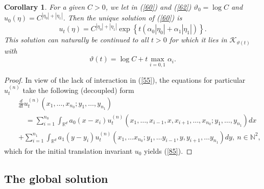 \documentclass[reqno,11pt]{amsart}
\newtheorem{corollary}[theorem]{Corollary}
\theoremstyle{definition}
\theoremstyle{remark}
\numberwithin{equation}{section}
\begin{document}
\begin{corollary}
  \label{D1co}
For a given $C>0$, we let in (\ref{60}) and (\ref{62})  $\vartheta_0
=\log C$ and $u_0 (\eta) = C^{|\eta_0|+|\eta_1|}$. Then the unique
solution of (\ref{60}) is
\begin{equation}
  \label{85}
u_t (\eta) = C^{|\eta_0|+|\eta_1|} \exp\left\{ t(\alpha_0 |\eta_0|+
\alpha_1 |\eta_1|)\right\}.
\end{equation}
This solution can naturally be continued to all $t>0$ for which it
lies in $\mathcal{K}_{\vartheta(t)}$ with
\begin{equation}
  \label{De}
\vartheta(t) =  \log C + t \max_{i=0,1}\alpha_i.
\end{equation}
\end{corollary}
\begin{proof}
In view of the lack of interaction in (\ref{55}), the equations for
particular $u^{(n)}_t$ take the following (decoupled) form
\begin{eqnarray*}
& &  \frac{d}{dt} u_t^{(n)} (x_1, \dots ,x_{n_0}; y_1, \dots ,y_{n_1}) \\[.2cm]
& & \quad =
 \sum_{i=1}^{n_0} \int_{\mathds{R}^d} a_0 (x- x_i) u_t^{(n)} (x_1,
 \dots , x_{i-1}, x , x_{i+1}, \dots ,x_{n_0}; y_1, \dots ,y_{n_1}) d x
 \\[.2cm]
 & &  +
 \sum_{i=1}^{n_1} \int_{\mathds{R}^d} a_1 (y- y_i) u_t^{(n)} (x_1,
 \dots x_{n_0};  y_1, \dots y_{i-1}, y , y_{i+1}, \dots  y_{n_1}) d
 y, \  n\in  \mathds{N}^2, \qquad \qquad
\end{eqnarray*}
which for the initial translation invariant $u_0$ yields (\ref{85}).
\end{proof}

\subsection{The global solution}
\end{document}
